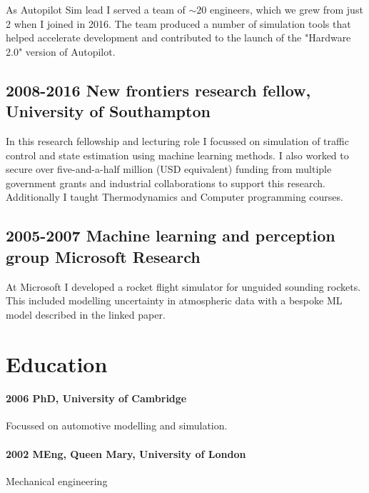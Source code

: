 As Autopilot Sim lead I served a team of $\sim\!\!20$ engineers, which we grew from just 2 when I joined in 2016. The team produced a number of simulation tools that helped accelerate development and contributed to the launch of the "Hardware 2.0" version of Autopilot.

\subsection{2008-2016 New frontiers research fellow, University of Southampton}


In this research fellowship and lecturing role I focussed on simulation of traffic control and state estimation using machine learning methods. I also worked to secure over five-and-a-half million (USD equivalent) funding from multiple government grants and industrial collaborations to support this research. Additionally I taught Thermodynamics and Computer programming courses.

\subsection{2005-2007 Machine learning and perception group Microsoft Research}

At Microsoft I developed a rocket flight simulator for unguided sounding rockets. This included modelling uncertainty in atmospheric data with a bespoke ML model described in the linked paper.

\section{Education}
\paragraph{2006 PhD, University of Cambridge}
Focussed on automotive modelling and simulation.
\paragraph{2002 MEng, Queen Mary, University of London}
Mechanical engineering

